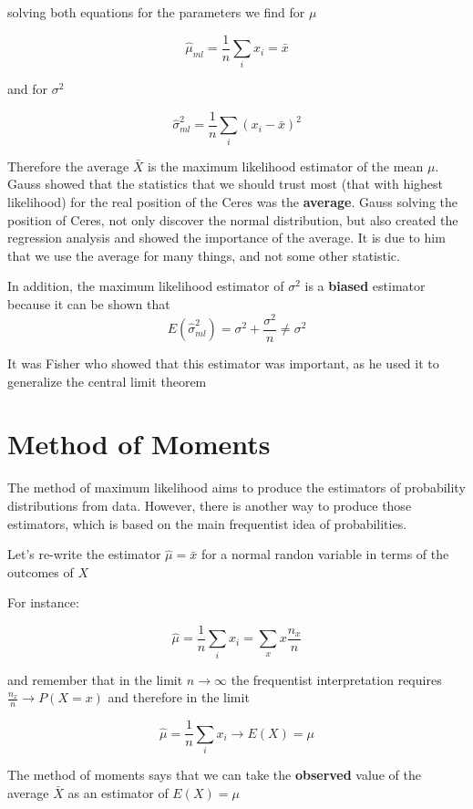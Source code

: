 \documentclass[
]{book}
\begin{document}
solving both equations for the parameters we find for \(\mu\)

\[\hat{\mu}_{ml}=\frac{1}{n}\sum_i x_i=\bar{x}\]

and for \(\sigma^2\)

\[\hat{\sigma}^2_{ml}=\frac{1}{n}\sum_i(x_i-\bar{x})^2\]

Therefore the average \(\bar{X}\) is the maximum likelihood estimator of the mean \(\mu\). Gauss showed that the statistics that we should trust most (that with highest likelihood) for the real position of the Ceres was the \textbf{average}. Gauss solving the position of Ceres, not only discover the normal distribution, but also created the regression analysis and showed the importance of the average. It is due to him that we use the average for many things, and not some other statistic.

In addition, the maximum likelihood estimator of \(\sigma^2\) is a \textbf{biased} estimator because it can be shown that \[E(\hat{\sigma}^2_{ml})=\sigma^2+\frac{\sigma^2}{n}\neq \sigma^2\]

It was Fisher who showed that this estimator was important, as he used it to generalize the central limit theorem

\hypertarget{method-of-moments}{%
\section{Method of Moments}\label{method-of-moments}}

The method of maximum likelihood aims to produce the estimators of probability distributions from data. However, there is another way to produce those estimators, which is based on the main frequentist idea of probabilities.

Let's re-write the estimator \(\hat{\mu}=\bar{x}\) for a normal randon variable in terms of the outcomes of \(X\)

For instance:

\[\hat{\mu}=\frac{1}{n}\sum_i x_i= \sum_x x \frac{n_x}{n}\]

and remember that in the limit \(n \rightarrow \infty\) the frequentist interpretation requires \(\frac{n_x}{n} \rightarrow P(X=x)\) and therefore in the limit

\[\hat{\mu}=\frac{1}{n}\sum_i x_i \rightarrow E(X)=\mu\]

The method of moments says that we can take the \textbf{observed} value of the average \(\bar{X}\) as an estimator of \(E(X)=\mu\)
\end{document}
